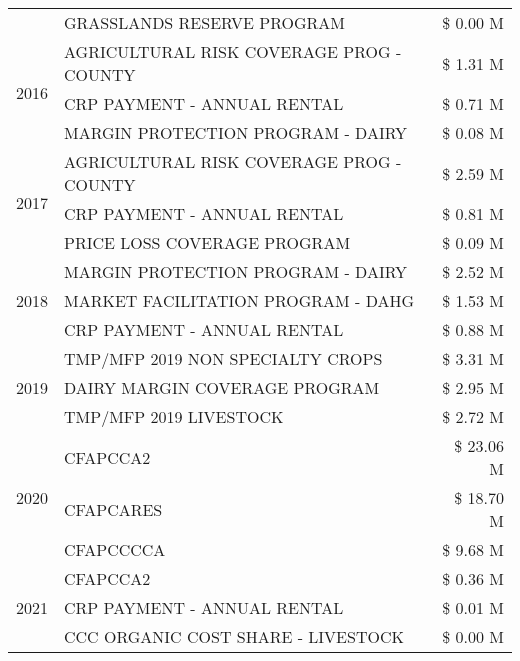 \begin{tabular}{llr}
 & GRASSLANDS RESERVE PROGRAM & \$ 0.00 M \\
\cline{1-3}
\multirow[t]{3}{*}{2016} & AGRICULTURAL RISK COVERAGE PROG - COUNTY & \$ 1.31 M \\
 & CRP PAYMENT - ANNUAL RENTAL & \$ 0.71 M \\
 & MARGIN PROTECTION PROGRAM - DAIRY & \$ 0.08 M \\
\cline{1-3}
\multirow[t]{3}{*}{2017} & AGRICULTURAL RISK COVERAGE PROG - COUNTY & \$ 2.59 M \\
 & CRP PAYMENT - ANNUAL RENTAL & \$ 0.81 M \\
 & PRICE LOSS COVERAGE PROGRAM & \$ 0.09 M \\
\cline{1-3}
\multirow[t]{3}{*}{2018} & MARGIN PROTECTION PROGRAM - DAIRY & \$ 2.52 M \\
 & MARKET FACILITATION PROGRAM - DAHG & \$ 1.53 M \\
 & CRP PAYMENT - ANNUAL RENTAL & \$ 0.88 M \\
\cline{1-3}
\multirow[t]{3}{*}{2019} & TMP/MFP 2019 NON SPECIALTY CROPS & \$ 3.31 M \\
 & DAIRY MARGIN COVERAGE PROGRAM & \$ 2.95 M \\
 & TMP/MFP 2019 LIVESTOCK & \$ 2.72 M \\
\cline{1-3}
\multirow[t]{3}{*}{2020} & CFAPCCA2 & \$ 23.06 M \\
 & CFAPCARES & \$ 18.70 M \\
 & CFAPCCCCA & \$ 9.68 M \\
\cline{1-3}
\multirow[t]{3}{*}{2021} & CFAPCCA2 & \$ 0.36 M \\
 & CRP PAYMENT - ANNUAL RENTAL & \$ 0.01 M \\
 & CCC ORGANIC COST SHARE - LIVESTOCK & \$ 0.00 M \\
\cline{1-3}
\bottomrule
\end{tabular}
